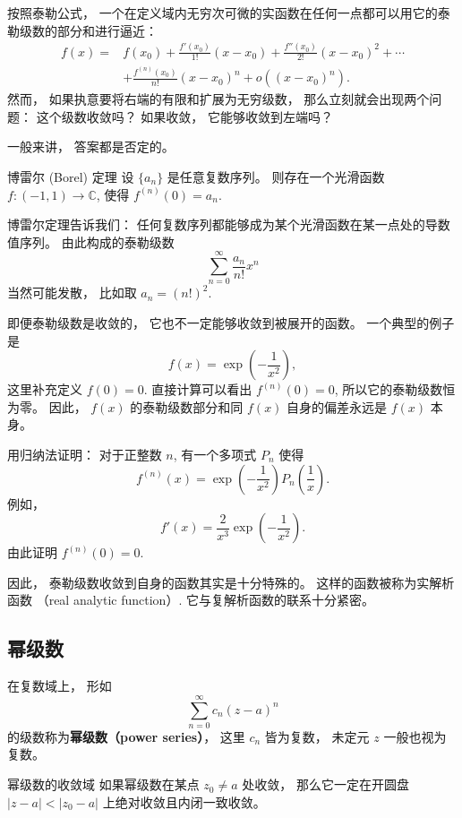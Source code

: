 

按照泰勒公式， 一个在定义域内无穷次可微的实函数在任何一点都可以用它的泰勒级数的部分和进行逼近：
$$
\begin{aligned}
f(x)=&f(x_0)+\frac{f'(x_0)}{1!}(x-x_0)+\frac{f''(x_0)}{2!}(x-x_0)^2+\cdots\\
&+\frac{f^{(n)}(x_0)}{n!}(x-x_0)^n+o((x-x_0)^n).
\end{aligned}
$$
然而， 如果执意要将右端的有限和扩展为无穷级数， 那么立刻就会出现两个问题： 这个级数收敛吗？ 如果收敛， 它能够收敛到左端吗？

一般来讲， 答案都是否定的。 

\begin{theorem}{博雷尔 (Borel) 定理}
设 $\{a_n\}$ 是任意复数序列。 则存在一个光滑函数 $f:(-1,1)\to\mathbb{C}$, 使得 $f^{(n)}(0)=a_n$.
\end{theorem}
博雷尔定理告诉我们： 任何复数序列都能够成为某个光滑函数在某一点处的导数值序列。 由此构成的泰勒级数
$$
\sum_{n=0}^\infty\frac{a_n}{n!}x^n
$$
当然可能发散， 比如取 $a_n=(n!)^2$.

即便泰勒级数是收敛的， 它也不一定能够收敛到被展开的函数。 一个典型的例子是
$$
f(x)=\exp\left(-\frac{1}{x^2}\right),
$$
这里补充定义 $f(0)=0$. 直接计算可以看出 $f^{(n)}(0)=0$, 所以它的泰勒级数恒为零。 因此， $f(x)$ 的泰勒级数部分和同 $f(x)$ 自身的偏差永远是 $f(x)$ 本身。

\begin{exercise}{}
用归纳法证明： 对于正整数 $n$, 有一个多项式 $P_n$ 使得
$$
f^{(n)}(x)=\exp\left(-\frac{1}{x^2}\right)P_n\left(\frac{1}{x}\right).
$$
例如， 
$$
f'(x)=\frac{2}{x^3}\exp\left(-\frac{1}{x^2}\right).
$$
由此证明 $f^{(n)}(0)=0$.
\end{exercise}

因此， 泰勒级数收敛到自身的函数其实是十分特殊的。 这样的函数被称为实解析函数 （real analytic function）. 它与复解析函数的联系十分紧密。

\subsection{幂级数}
在复数域上， 形如
\begin{equation}
\sum_{n=0}^\infty c_n(z-a)^n
\end{equation}
的级数称为\textbf{幂级数（power series）}， 这里 $c_n$ 皆为复数， 未定元 $z$ 一般也视为复数。 

\begin{theorem}{幂级数的收敛域}
如果幂级数在某点 $z_0\neq a$ 处收敛， 那么它一定在开圆盘 $|z-a|<|z_0-a|$ 上绝对收敛且内闭一致收敛。
\end{theorem}

